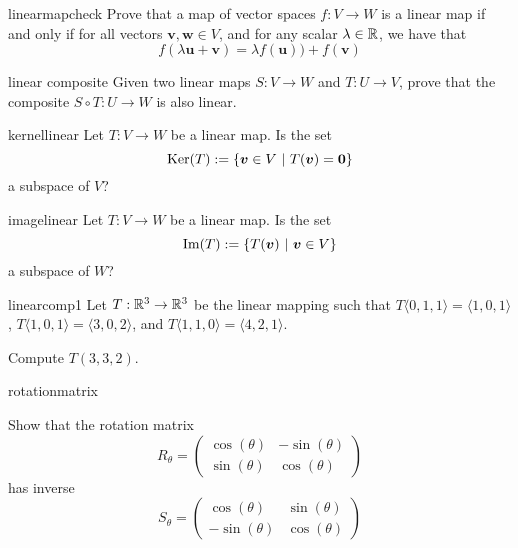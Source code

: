 \begin{problem}{linearmapcheck}
Prove that a map of vector spaces $f: V \to W$ is a linear map if and only if for all vectors $\bm{v}, \bm{w} \in V$, and for any scalar $\lambda \in \mathbb{R}$, we have that
$$f(\lambda \bm{u} + \bm{v}) = \lambda f(\bm{u}))+ f(\bm{v})$$

\end{problem}

\begin{problem}{linear composite}
Given two linear maps $S: V \to W$ and $T : U \to V$, prove that the composite $S \circ T : U \to W$ is also linear.
\end{problem}

\begin{problem}{kernellinear}
Let $T : V \to W$ be a linear map.  Is the set $$\textnormal{Ker}(T) := \{ \bm{v} \in V \ | \ T(\bm{v}) = \bm{0} \}$$ a subspace of $V$?
\end{problem}

\begin{problem}{imagelinear}
Let $T : V \to W$ be a linear map.  Is the set $$\textnormal{Im}(T) := \{ T(\bm{v}) \ | \ \bm{v} \in V\}$$ a subspace of $W$?
\end{problem}

\begin{problem}{linearcomp1}
    Let $T : \mathbb{R}^3 \to \mathbb{R}^3$ be the linear mapping such that $T\langle0,1,1\rangle = \langle1,0,1\rangle$, $T\langle1,0,1\rangle = \langle3,0,2\rangle$, and $T\langle1,1,0\rangle = \langle4,2,1\rangle$. 
    
    Compute $T(3, 3, 2)$.
\end{problem}

\begin{problem}{rotationmatrix}
    
    Show that the rotation matrix \begin{equation*}
R_\theta = 
\begin{pmatrix}
\cos(\theta) & -\sin(\theta) \\
\sin(\theta) & \cos(\theta)
\end{pmatrix}
\end{equation*}
has inverse \begin{equation*}
S_{\theta} = 
\begin{pmatrix}
\cos(\theta) & \sin(\theta) \\
-\sin(\theta) & \cos(\theta)
\end{pmatrix}
\end{equation*}
    
\end{problem}

